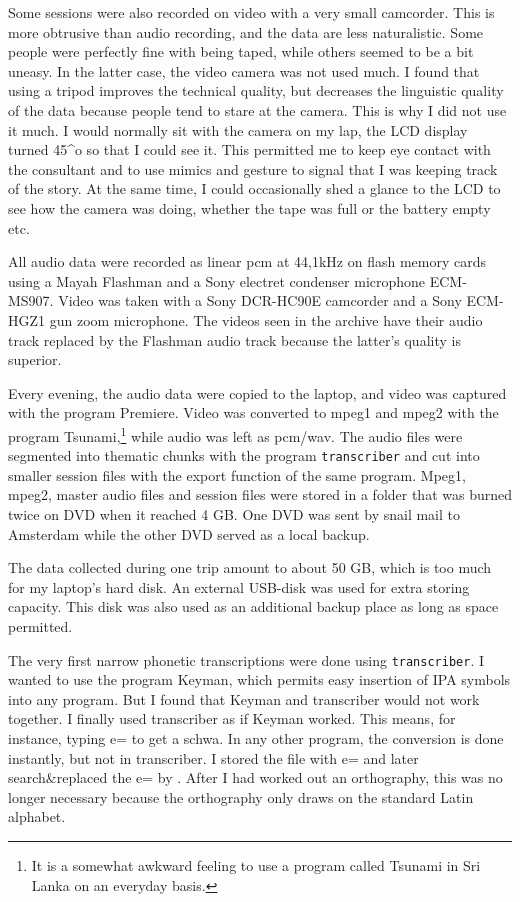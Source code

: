 Some sessions were also recorded on video with a very small camcorder. This is more obtrusive than audio recording, and the data are less naturalistic. Some people were perfectly fine with being taped, while others seemed to be a bit uneasy. In the latter case, the video camera was not used much. I found that using a tripod improves the technical quality, but decreases the linguistic quality of the data because people tend to stare at the camera. This is why I did not use it much. I would normally sit with the camera on my lap, the LCD display turned 45^{o} so that I could see it. This permitted me  to keep eye contact with the consultant and to use mimics and gesture to signal that I was keeping track of the story. At the same time, I could occasionally shed a glance to the LCD to see how the camera was doing, whether the tape was full or the battery empty etc.

All audio data were recorded as linear pcm at 44,1kHz on flash memory cards using a Mayah Flashman  and a Sony electret condenser microphone ECM-MS907. Video was taken with a Sony DCR-HC90E camcorder and a Sony ECM-HGZ1 gun zoom microphone. The videos seen in the archive have their audio track replaced by the Flashman audio track because the latter's quality is superior.

Every evening, the audio data were copied to the laptop, and video was captured with the program Premiere. Video was converted to mpeg1 and mpeg2 with the program Tsunami,\footnote{It is a somewhat awkward feeling to use a program called Tsunami in Sri Lanka on an everyday basis.} while audio was left as pcm/wav. The audio files were segmented into thematic chunks with the program \texttt{transcriber} and cut into smaller session files with the export function of the same program. Mpeg1, mpeg2, master audio files and session files were stored in a folder that was burned twice on DVD when it reached 4 GB. One DVD was sent by snail mail to Amsterdam while the other DVD served as a local backup.

The data collected during one trip amount to about 50 GB, which is too much for my laptop's hard disk. An external USB-disk was used for extra storing capacity. This disk was also used as an additional backup place as long as space permitted.

The very first narrow phonetic transcriptions were done using \texttt{transcriber}. I wanted to use the program Keyman, which permits easy insertion of IPA symbols into any program. But I found that Keyman and transcriber would not work together. I finally used transcriber as if Keyman worked. This means, for instance, typing e= to get a schwa. In any other program, the conversion is done instantly, but not in transcriber. I stored the file with e= and later search\&replaced the e= by \E. After I had worked out an orthography, this was no longer necessary because the orthography only draws on the standard Latin alphabet.

